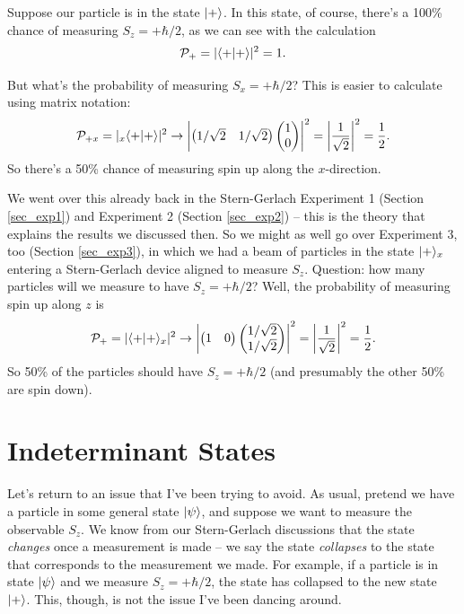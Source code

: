 \begin{example}
Suppose our particle is in the state $| + \rangle$.  In this state, of course, there's a 100\% chance of measuring $S_z = +\hbar/2$, as we can see with the calculation
\[
\mathcal{P}_+ = |\langle + | + \rangle|^2 = 1.
\]

But what's the probability of measuring $S_x = +\hbar/2$?  This is easier to calculate using matrix notation:
\[
\mathcal{P}_{+x} = | _x \langle + | + \rangle|^2 \to 
\left| 
\begin{pmatrix} 1/\sqrt{2} & 1/\sqrt{2} \end{pmatrix}
\begin{pmatrix} 1 \\ 0 \end{pmatrix}
\right|^2 = \left| \frac{1}{\sqrt{2}} \right|^2 = \frac{1}{2}.
\]
So there's a 50\% chance of measuring spin up along the $x$-direction.

We went over this already back in the Stern-Gerlach Experiment 1 (Section \ref{sec_exp1}) and Experiment 2 (Section \ref{sec_exp2}) -- this is the theory that explains the results we discussed then.  So we might as well go over Experiment 3, too (Section \ref{sec_exp3}), in which we had a beam of particles in the state $| + \rangle_x$ entering a Stern-Gerlach device aligned to measure $S_z$.  Question:  how many particles will we measure to have $S_z = +\hbar/2$?  Well, the probability of measuring spin up along $z$ is
\[
\mathcal{P}_{+} = |  \langle + | + \rangle_x|^2 \to 
\left| 
\begin{pmatrix} 1 & 0 \end{pmatrix}
\begin{pmatrix} 1/\sqrt{2} \\ 1/\sqrt{2} \end{pmatrix}
\right|^2 = \left| \frac{1}{\sqrt{2}} \right|^2 = \frac{1}{2}.
\]
So 50\% of the particles should have $S_z = +\hbar/2$ (and presumably the other 50\% are spin down).

\end{example}


\section{Indeterminant States}
\label{sec_indeterminant_states}

Let's return to an issue that I've been trying to avoid.  As usual, pretend we have a particle in some general state $| \psi \rangle$, and suppose we want to measure the observable $S_z$.  We know from our Stern-Gerlach discussions that the state \emph{changes} once a measurement is made -- we say the state \emph{collapses} to the state that corresponds to the measurement we made.  For example, if a particle is in state $| \psi \rangle$ and we measure $S_z = +\hbar/2$, the state has collapsed to the new state $| + \rangle$.  This, though, is not the issue I've been dancing around.


